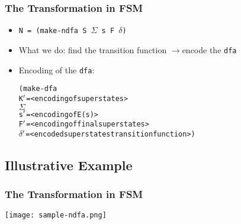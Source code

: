 \documentclass{beamer}
\newcommand{\arrow}{\(\rightarrow\)}
\newcommand{\sig}{\texttt{\(\Sigma\)}}
\newcommand{\delt}{\texttt{\(\delta\)}}
\newcommand{\dfa}{\texttt{dfa}}
\begin{document}
\begin{frame}[fragile]
\frametitle{The Transformation in FSM}
\begin{scriptsize}
\begin{itemize}
\normalsize
\item<1->  \texttt{N = (make-ndfa S \sig{} s F \delt)} 

\item<1->What we do: find the transition function \arrow encode the \dfa{} 

\item<2-> Encoding of the \texttt{dfa}:
\begin{alltt}
 (make-dfa
   K\(\sp{\prime}\)=<encoding of super states>
   \sig{}
   s\(\sp{\prime}\)=<encoding of E(s)>
   F\(\sp{\prime}\)=<encoding of final super states>
   \delt{}\(\sp{\prime}\)=<encoded super states transition function>)
\end{alltt}
\end{itemize}
\end{scriptsize}
\end{frame}

\subsection{Illustrative Example}

\begin{frame}[fragile]
\frametitle{The Transformation in FSM}
\begin{scriptsize}

\begin{center}
\texttt{[image: sample-ndfa.png]}
\end{center}


\end{scriptsize}
\end{frame}
\end{document}
